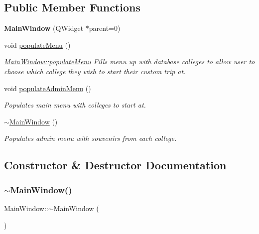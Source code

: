 \subsection*{Public Member Functions}
\begin{DoxyCompactItemize}
\item 
\mbox{\label{class_main_window_a8b244be8b7b7db1b08de2a2acb9409db}} 
{\bfseries Main\+Window} (Q\+Widget $\ast$parent=0)
\item 
\mbox{\label{class_main_window_ae253918de1b351d401c09856a6fef45a}} 
void \mbox{\hyperlink{class_main_window_ae253918de1b351d401c09856a6fef45a}{populate\+Menu}} ()
\begin{DoxyCompactList}\small\item\em \mbox{\hyperlink{class_main_window_ae253918de1b351d401c09856a6fef45a}{Main\+Window\+::populate\+Menu}} Fills menu up with database colleges to allow user to choose which college they wish to start their custom trip at. \end{DoxyCompactList}\item 
void \mbox{\hyperlink{class_main_window_a8fd82811fcee5c9a13ea833a474950bb}{populate\+Admin\+Menu}} ()
\begin{DoxyCompactList}\small\item\em Populates main menu with colleges to start at. \end{DoxyCompactList}\item 
\mbox{\hyperlink{class_main_window_ae98d00a93bc118200eeef9f9bba1dba7}{$\sim$\+Main\+Window}} ()
\begin{DoxyCompactList}\small\item\em Populates admin menu with souvenirs from each college. \end{DoxyCompactList}\end{DoxyCompactItemize}


\subsection{Constructor \& Destructor Documentation}
\mbox{\label{class_main_window_ae98d00a93bc118200eeef9f9bba1dba7}} 
\subsubsection{\texorpdfstring{$\sim$\+Main\+Window()}{~MainWindow()}}
{\footnotesize\ttfamily Main\+Window\+::$\sim$\+Main\+Window (\begin{DoxyParamCaption}{ }\end{DoxyParamCaption})}



